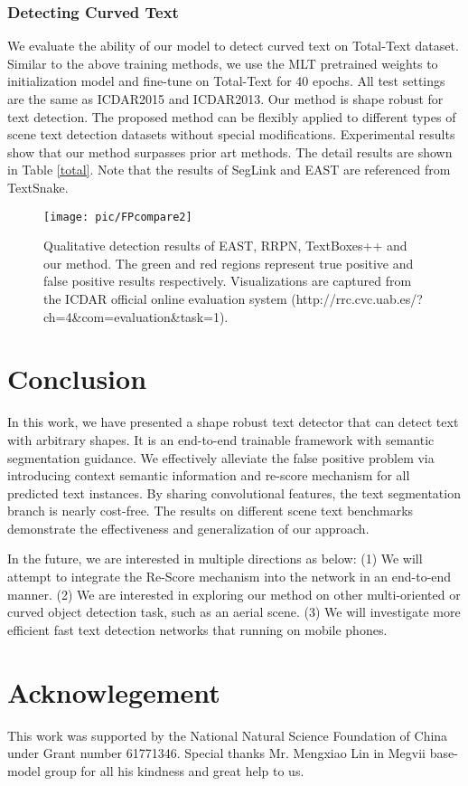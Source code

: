 \documentclass[letterpaper]{article} \usepackage{aaai19}  \usepackage{times}  \usepackage{helvet}  \usepackage{courier}  \usepackage{url}  \usepackage{graphicx}
\begin{document}
\subsubsection{Detecting Curved Text }
We evaluate the ability of our model to detect curved text on Total-Text dataset. 
Similar to the above training methods, we use the MLT pretrained weights to initialization model and fine-tune on Total-Text for 40 epochs.
All test settings are the same as ICDAR2015 and ICDAR2013. 
Our method is shape robust for text detection. 
The proposed method can be flexibly applied to different types of scene text detection datasets without special modifications.
 Experimental results show that our method surpasses prior art methods. 
 The detail results are shown in Table \ref{total}.
 Note that the results of SegLink and EAST are referenced from TextSnake.


\begin{figure}[ht!]
\centering
\texttt{[image: pic/FPcompare2]}
\caption{\label{FP}{Qualitative detection results of EAST, RRPN\cite{ma2018arbitrary}, TextBoxes++\cite{liao2018textboxes++} and our method. The green and red regions represent true positive and false positive results respectively. Visualizations are captured from the ICDAR official online evaluation
system (http://rrc.cvc.uab.es/?ch=4\&com=evaluation\&task=1).
}}
\end{figure}







\section{Conclusion}

In this work, we have presented a shape robust text detector that can detect text with arbitrary shapes. It is an end-to-end trainable framework with semantic segmentation guidance. We effectively alleviate the false positive problem via introducing context semantic information and re-score mechanism for all predicted text instances.
By sharing convolutional features, the text segmentation branch is nearly cost-free. The results on different scene text benchmarks demonstrate the effectiveness and generalization of our approach.

In the future, we are interested in multiple directions as below:
(1) We will attempt to integrate the Re-Score mechanism into the network in an end-to-end manner.
(2) We are interested in exploring our method on other multi-oriented or curved object detection task, such as an aerial scene. 
(3) We will investigate more efficient fast text detection networks that running on mobile phones. 

\section{Acknowlegement}
This work was supported by the National Natural Science Foundation of China under Grant number 61771346. Special thanks Mr. Mengxiao Lin in Megvii base-model group for all his kindness and great
help to us. 


 
\end{document}
